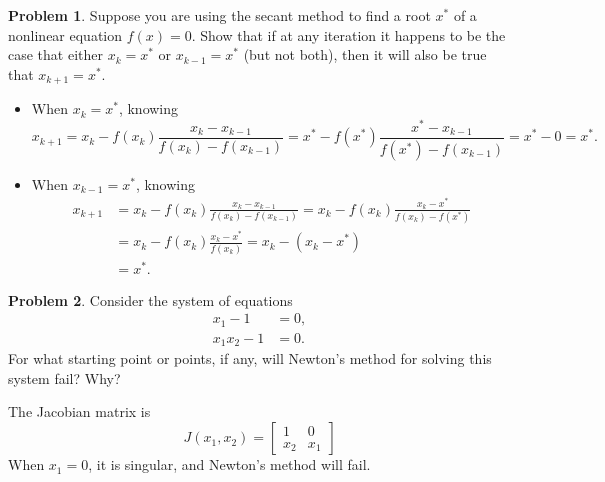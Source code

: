 \documentclass[a4paper]{book}
\makeatletter
\newenvironment{sol}[1][\solname]{\par
  \pushQED{\qed}
  \normalfont \topsep6\p@\@plus6\p@\relax
  \trivlist
  \item[\hskip\labelsep
        \itshape
    #1\@addpunct{.}]\ignorespaces
}{\popQED\endtrivlist\@endpefalse}
\providecommand{\solname}{Solution}
\numberwithin{equation}{chapter}
\theoremstyle{definition}
\newtheorem{pro}{Problem}
\makeatother
\begin{document}
  \begin{pro}
    Suppose you are using the secant method to find a root $x^{*}$ of a
    nonlinear equation $f(x)=0$.
    Show that if at any iteration it happens to be the case that either
    $x_k=x^{*}$ or $x_{k-1}=x^{*}$
    (but not both),
    then it will also be true that $x_{k+1}=x^{*}$.
  \end{pro}
  \begin{sol}
    \begin{itemize}
    \item
      When $x_k=x^{*}$, knowing
      \begin{displaymath}
        x_{k+1} = x_k - f(x_k)\frac{x_k-x_{k-1}}{f(x_k)-f(x_{k-1})}
        = x^{*} - f(x^{*})\frac{x^{*}-x_{k-1}}{f(x^{*})-f(x_{k-1})}
        = x^{*} - 0 = x^{*}.
      \end{displaymath}
  
    \item
      When $x_{k-1}=x^{*}$, knowing
      \begin{align*}
        x_{k+1} &= x_k - f(x_k)\frac{x_k-x_{k-1}}{f(x_k)-f(x_{k-1})}
                  = x_k - f(x_k)\frac{x_k - x^{*}}{f(x_k)-f(x^{*})} \\
        &= x_k - f(x_k) \frac{x_k-x^{*}}{f(x_k)} = x_k - (x_k - x^{*})
        \\
        &= x^{*}.
      \end{align*}
    \end{itemize}
  \end{sol}

  \begin{pro}
    Consider the system of equations
    \begin{align*}
      x_1 - 1 &= 0, \\
      x_1x_2 - 1 &= 0.
    \end{align*}
    For what starting point or points,
    if any,
    will Newton's method for solving this system fail?
    Why?
  \end{pro}
  
  \begin{sol}
    The Jacobian matrix is
    \begin{displaymath}
      J(x_1, x_2) =
      \begin{bmatrix}
        1 & 0 \\
        x_2 & x_1
      \end{bmatrix}
    \end{displaymath}
    When $x_1=0$, 
    it is singular,
    and Newton's method will fail.
  \end{sol}
\end{document}
